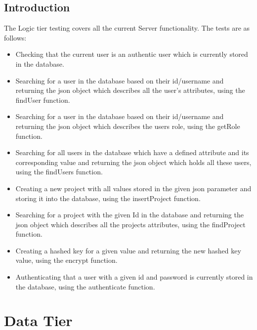 \documentclass[]{article}
\begin{document}
	\subsection{Introduction}
	The Logic tier testing covers all the current Server functionality. The tests are as follows: 
	\begin{itemize}
    		\item Checking that the current user is an authentic user which is currently stored in the database.
    		
            \item Searching for a user in the database based on their id/username and returning the json object which describes all the user's attributes, using the findUser function.
            
            \item Searching for a user in the database based on their id/username and returning the json object which describes the users role, using the getRole function.
            
            \item Searching for all users in the database which have a defined attribute and its corresponding value and returning the json object which holds all these users, using the findUsers function. 
            
            \item Creating a new project  with all values stored in the given json parameter and storing it into the database, using the insertProject function.
            
            \item Searching for a project with the given Id in the database and returning the json object which describes all the projects attributes, using the findProject function.
            
            \item Creating a hashed key for a given value and returning the new hashed key value, using the encrypt function.
            
            \item Authenticating that a user with a given id and password is currently stored in the database, using the authenticate function. 
        \end{itemize}
    
    \section{Data Tier}
\end{document}
